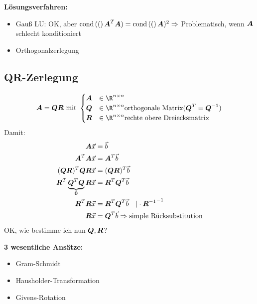 \textbf{Lösungsverfahren:}
\begin{itemize}
\item Gauß LU: OK, aber $\text{cond}\left((\right)\boldsymbol {A}^T\boldsymbol {A}) = \text{cond}\left((\right)\boldsymbol {A})^2\Rightarrow$ Problematisch, wenn $\boldsymbol {A}$ schlecht konditioniert
\item Orthogonalzerlegung
\end{itemize}

\subsection{QR-Zerlegung}
\[\ma A = \ma Q\ma R \text{ mit }\begin{cases}
\ma A & \in \R^{n\times n}\\
\ma Q & \in \R^{n\times n} \text{orthogonale Matrix} (\ma Q^T = \ma Q^{-1})\\
\ma R & \in \R^{n\times n} \text{rechte obere Dreiecksmatrix}
\end{cases}\]
Damit:
\begin{equation}
\begin{split}
\boldsymbol {A}\vec x &= \vec b\\
\boldsymbol {A}^T\boldsymbol {A}\vec x &= \boldsymbol {A}^T\vec b\\
(\boldsymbol {Q}\boldsymbol {R})^T\boldsymbol {Q}\boldsymbol {R}\vec x &= (\boldsymbol {Q}\boldsymbol {R})^T\vec b\\
\boldsymbol {R}^T\underbrace{\boldsymbol {Q}^T\boldsymbol {Q}}_{\boldsymbol {0}}\boldsymbol {R}\vec x &= \boldsymbol {R}^T\boldsymbol {Q}^T\vec b\\
\boldsymbol {R}^T\boldsymbol {R}\vec x &= \boldsymbol {R}^T\boldsymbol {Q}^T\vec b\quad\vert\cdot{\ensuremath{\boldsymbol {R}}^{-1}}^{-1}\\
\boldsymbol {R}\vec x &= \boldsymbol {Q}^T\vec b\Rightarrow \text{simple Rücksubstitution}
\end{split}
\end{equation}
OK, wie bestimme ich nun $\boldsymbol {Q},\boldsymbol {R}$?

\textbf{3 wesentliche Ansätze:}
\begin{itemize}
\item Gram-Schmidt
\item Hausholder-Transformation
\item Givens-Rotation
\end{itemize}